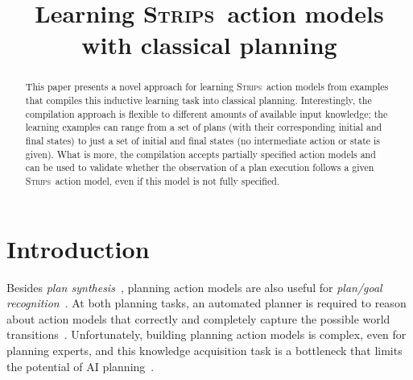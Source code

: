 \documentclass[letterpaper]{article} %
\newcommand{\strips}{\textsc{Strips}}     %
\begin{document}
\title{Learning \strips\ action models with classical planning}


\maketitle
\begin{abstract}
This paper presents a novel approach for learning \strips\ action models from examples that compiles this inductive learning task into classical planning. Interestingly, the compilation approach is flexible to different amounts of available input knowledge; the learning examples can range from a set of plans (with their corresponding initial and final states) to just a set of initial and final states (no intermediate action or state is given). What is more, the compilation accepts partially specified action models and can be used to validate whether the observation of a plan execution follows a given \strips\ action model, even if this model is not fully specified.
\end{abstract}


\section{Introduction}
Besides {\em plan synthesis}~\cite{ghallab2004automated}, planning action models are also useful for {\em plan/goal recognition}~\cite{ramirez2012plan}. At both planning tasks, an automated planner is required to reason about action models that correctly and completely capture the possible world transitions~\cite{geffner:book:2013}. Unfortunately, building planning action models is complex, even for planning experts, and this knowledge acquisition task is a bottleneck that limits the potential of AI planning~\cite{kambhampati:modellite:AAAI2007}.
\end{document}
